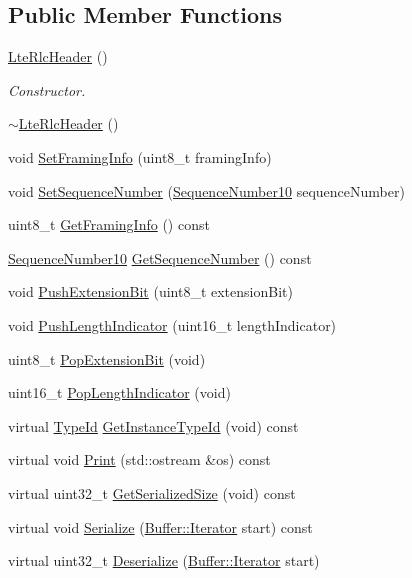 \subsection*{Public Member Functions}
\begin{DoxyCompactItemize}
\item 
\hyperlink{classns3_1_1LteRlcHeader_acdbb2c811c850604a47f88b97def1f57}{Lte\+Rlc\+Header} ()
\begin{DoxyCompactList}\small\item\em Constructor. \end{DoxyCompactList}\item 
\hyperlink{classns3_1_1LteRlcHeader_a43c0c94b40aace94456130caba6f5ca1}{$\sim$\+Lte\+Rlc\+Header} ()
\item 
void \hyperlink{classns3_1_1LteRlcHeader_a7c3cadb859bb3e3b832a7359ca3b36f7}{Set\+Framing\+Info} (uint8\+\_\+t framing\+Info)
\item 
void \hyperlink{classns3_1_1LteRlcHeader_a784080f119b1d793c2519b3941df128c}{Set\+Sequence\+Number} (\hyperlink{classns3_1_1SequenceNumber10}{Sequence\+Number10} sequence\+Number)
\item 
uint8\+\_\+t \hyperlink{classns3_1_1LteRlcHeader_a3f3986f2bd852e7e48df6f56616b5fd8}{Get\+Framing\+Info} () const 
\item 
\hyperlink{classns3_1_1SequenceNumber10}{Sequence\+Number10} \hyperlink{classns3_1_1LteRlcHeader_a2d3e13e21eea67fae72a636c0a273ebb}{Get\+Sequence\+Number} () const 
\item 
void \hyperlink{classns3_1_1LteRlcHeader_a2f1eed1174811a40fbd2efb438329f1d}{Push\+Extension\+Bit} (uint8\+\_\+t extension\+Bit)
\item 
void \hyperlink{classns3_1_1LteRlcHeader_afbb93230551032b6ef67e55e7bc44ad5}{Push\+Length\+Indicator} (uint16\+\_\+t length\+Indicator)
\item 
uint8\+\_\+t \hyperlink{classns3_1_1LteRlcHeader_a63f21ccde901bd9c37e946792fd780a4}{Pop\+Extension\+Bit} (void)
\item 
uint16\+\_\+t \hyperlink{classns3_1_1LteRlcHeader_a815ab76d4869be1d40f3d8a6b5e5e6f0}{Pop\+Length\+Indicator} (void)
\item 
virtual \hyperlink{classns3_1_1TypeId}{Type\+Id} \hyperlink{classns3_1_1LteRlcHeader_aa84ff2e9d8eb9442ef022bcb091fb2ca}{Get\+Instance\+Type\+Id} (void) const 
\item 
virtual void \hyperlink{classns3_1_1LteRlcHeader_acea1a2de8d3d70330d3a7813c854aa7a}{Print} (std\+::ostream \&os) const 
\item 
virtual uint32\+\_\+t \hyperlink{classns3_1_1LteRlcHeader_ab9438faeeb5a7d22b39d9544feb01477}{Get\+Serialized\+Size} (void) const 
\item 
virtual void \hyperlink{classns3_1_1LteRlcHeader_a8c8ef9a9c622335c04dcef2eb1c403a1}{Serialize} (\hyperlink{classns3_1_1Buffer_1_1Iterator}{Buffer\+::\+Iterator} start) const 
\item 
virtual uint32\+\_\+t \hyperlink{classns3_1_1LteRlcHeader_a7b1753869046358b6236cfcb7114d061}{Deserialize} (\hyperlink{classns3_1_1Buffer_1_1Iterator}{Buffer\+::\+Iterator} start)
\end{DoxyCompactItemize}
